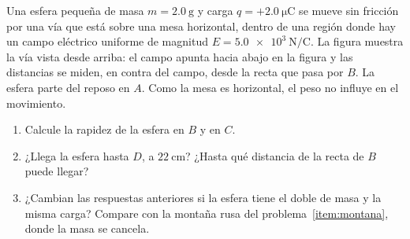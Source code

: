 %

\item\label{item:montana-electrica} Una esfera pequeña de masa $m=\qty{2.0}{\g}$ y carga $q=+\qty{2.0}{\micro\coulomb}$ se mueve sin fricción por una vía que está sobre una mesa horizontal, dentro de una región donde hay un campo eléctrico uniforme de magnitud $E=\qty{5.0e3}{\N/\coulomb}$. La figura muestra la vía vista desde arriba: el campo apunta hacia abajo en la figura y las distancias se miden, en contra del campo, desde la recta que pasa por $B$. La esfera parte del reposo en $A$. Como la mesa es horizontal, el peso no influye en el movimiento.

\begin{center}
\end{center}

\begin{enumerate}
    \item Calcule la rapidez de la esfera en $B$ y en $C$.
    \item ¿Llega la esfera hasta $D$, a $\qty{22}{\cm}$? ¿Hasta qué distancia de la recta de $B$ puede llegar?
    \item ¿Cambian las respuestas anteriores si la esfera tiene el doble de masa y la misma carga? Compare con la montaña rusa del problema~\ref{item:montana}, donde la masa se cancela.
\end{enumerate}

